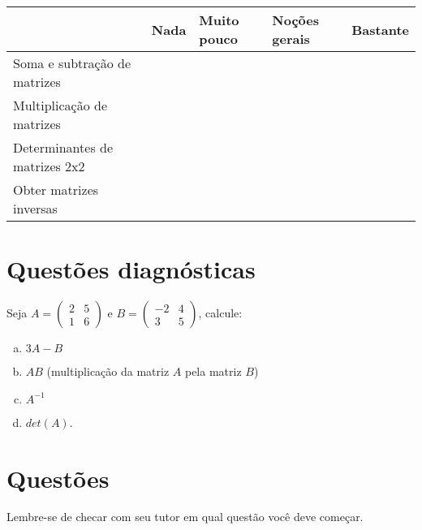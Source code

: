 \documentclass[main_estudante.tex]{subfiles}
\begin{document}
\begin{center}
 \begin{tabular}{|p{35mm}||p{15mm}|p{15mm}|p{15mm}|p{15mm}|} 
 \hline
   & Nada & Muito pouco & Noções gerais & Bastante\\
 \hline
 Soma e subtração de matrizes &  &  &  &  \\ 
 \hline
 Multiplicação de matrizes &  &  &  &  \\
 \hline
 Determinantes de matrizes 2x2 &  &  &  &  \\
 \hline
 Obter matrizes inversas &  &  &  &  \\
 \hline
\end{tabular}
\end{center}


\section{Questões diagnósticas}

\begin{diagnostico}
Seja $A=\begin{pmatrix}2 & 5 \\ 1 & 6\end{pmatrix}$ e $B=\begin{pmatrix}-2 & 4 \\ 3 & 5\end{pmatrix}$, calcule:
\begin{enumerate}[a)]
  \item $3A-B$
  
\vspace{30 mm}
\hrulefill
  
  \item $AB$ (multiplicação da matriz $A$ pela matriz $B$)
  
\vspace{30 mm}
\hrulefill

  \item $A^{-1}$
  
\vspace{30 mm}
\hrulefill
  
  \item $det(A)$.
\end{enumerate}
\end{diagnostico}


\section{Questões}

Lembre-se de checar com seu tutor em qual questão você deve começar.
\end{document}

